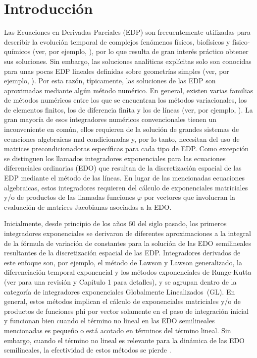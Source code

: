 \chapter*{Introducción}\label{chapter:introduction}

Las Ecuaciones en Derivadas Parciales (EDP) son frecuentemente utilizadas para describir la evolución temporal de complejos fenómenos físicos, biofísicos y físico-químicos (ver, por ejemplo, \cite{tikhonov2013,gray1990,cronin1987}), por lo que resulta de gran interés práctico obtener sus soluciones. Sin embargo, las soluciones analíticas explícitas solo son conocidas para unas pocas EDP lineales definidas sobre geometrías simples (ver, por ejemplo, \cite{tikhonov2013}). Por esta razón, típicamente, las soluciones de las EDP son aproximadas mediante algún método numérico. En general, existen varias familias de métodos numéricos entre los que se encuentran los métodos variacionales, los de elementos finitos, los de diferencia finita y los de líneas (ver, por ejemplo, \cite{prenter2008,samarskii2008,schiesser2012}). La gran mayoría de esos integradores numéricos convencionales tienen un inconveniente en común, ellos requieren de la solución de grandes sistemas de ecuaciones algebraicas mal condicionadas y, por lo tanto, necesitan del uso de matrices precondicionadoras específicas para cada tipo de EDP. Como excepción se distinguen los llamados integradores exponenciales para las ecuaciones diferenciales ordinarias (EDO) que resultan de la discretización espacial de las EDP mediante el método de las líneas. En lugar de las mencionadas ecuaciones algebraicas, estos integradores requieren del cálculo de exponenciales matriciales y/o de productos de las llamadas funciones $\varphi$ por vectores que involucran la evaluación de matrices Jacobianas asociadas a la EDO.

Inicialmente, desde principio de los años 60 del siglo pasado, los primeros  integradores exponenciales se derivaron de diferentes aproximaciones a la integral de la fórmula de variación de constantes para la solución de las EDO semilineales resultantes de la discretización espacial de las EDP. Integradores derivados de este enfoque son, por ejemplo, el método de Lawson y Lawson generalizado, la diferenciación temporal exponencial y los métodos exponenciales de Runge-Kutta (ver \cite{Berland07} para una revisión y Capítulo 1 para detalles), y se agrupan dentro de la categoría de integradores exponenciales Globalmente Linealizados~(GL). En general, estos métodos implican el cálculo de exponenciales matriciales y/o de productos de funciones phi por vector solamente en el paso de integración inicial y funcionan bien cuando el término no lineal en las EDO semilineales mencionadas es pequeño o está acotado en términos del término lineal. Sin embargo, cuando el término no lineal es relevante para la dinámica de las EDO semilineales, la efectividad de estos métodos se pierde \cite{hochbruck2009exponential}.


